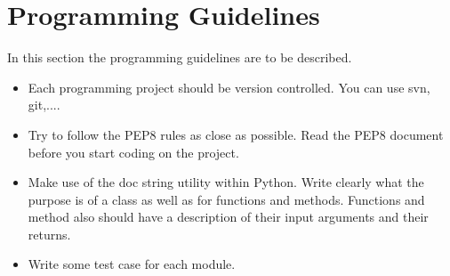 \documentclass[11pt]{article}
\begin{document}
\thispagestyle{empty}
\renewcommand{\labelitemii}{$\star$}
\pagebreak
\pagestyle{plain}
\setcounter{page}{1}
\section*{Programming Guidelines}
In this section the programming guidelines are to be described.

\begin{itemize} 
\item Each programming project should be version controlled. You can 
use svn, git,....
\item Try to follow the PEP8 rules as close as possible. Read the PEP8 document 
before you start coding on the project.
\item Make use of the doc string utility within Python. Write clearly what the purpose is of a
class as well as for functions and methods. Functions and method also should have a description 
of their input arguments and their returns.
\item Write some test case for each module.
\end{itemize}



\end{document}
